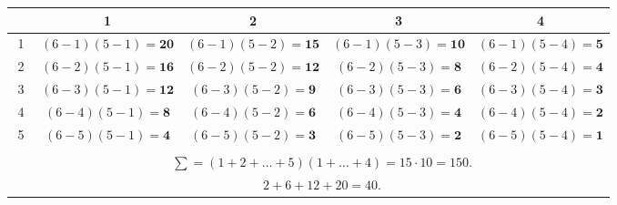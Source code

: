\begin{center}
\begin{tabular}{|c|c|c|c|c|}
\hline\ \ &1&2&3&4\\ & $(6−1) (5−1) = \mathbf{20}$ & $(6−1) (5−2) = \mathbf{15}$ & $(6−1) (5−3) = \mathbf{10}$ & $(6−1) (5−4) = \mathbf{5} $ \\
& $(6−2) (5−1) = \mathbf{16}$ & $(6−2) (5−2) = \mathbf{12}$ & $(6−2) (5−3) = \mathbf{8}$ & $(6−2) (5−4) = \mathbf{4} $ \\
& $(6−3) (5−1) = \mathbf{12}$ & $(6−3) (5−2) = \mathbf{9}$ & $(6−3) (5−3) = \mathbf{6}$ & $(6−3) (5−4) = \mathbf{3} $ \\
& $(6−4) (5−1) = \mathbf{8}$ & $(6−4) (5−2) = \mathbf{6}$ & $(6−4) (5−3) = \mathbf{4}$ & $(6−4) (5−4) = \mathbf{2} $ \\
& $(6−5) (5−1) = \mathbf{4}$ & $(6−5) (5−2) = \mathbf{3}$ & $(6−5) (5−3) = \mathbf{2}$ & $(6−5) (5−4) = \mathbf{1} $ \\
\hline
	 \\
\hline
\ &  \\
\hline
\ &  \\ \hline
\end{tabular}
\end{center}
